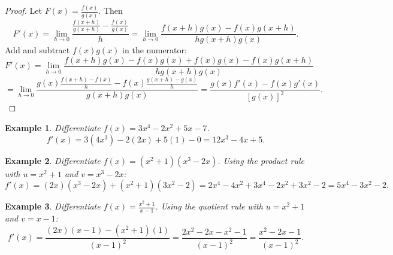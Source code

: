 \documentclass[11pt,a4paper]{article}
\newtheorem{example}{Example}
\begin{document}
\begin{proof}
Let $F(x) = \frac{f(x)}{g(x)}$. Then
\[
F'(x) = \lim_{h \to 0} \frac{\frac{f(x+h)}{g(x+h)} - \frac{f(x)}{g(x)}}{h} = \lim_{h \to 0} \frac{f(x+h)g(x) - f(x)g(x+h)}{h g(x+h) g(x)}.
\]
Add and subtract $f(x)g(x)$ in the numerator:
\[
F'(x) = \lim_{h \to 0} \frac{f(x+h)g(x) - f(x)g(x) + f(x)g(x) - f(x)g(x+h)}{h g(x+h) g(x)}
\]
\[
= \lim_{h \to 0} \frac{g(x) \frac{f(x+h) - f(x)}{h} - f(x) \frac{g(x+h) - g(x)}{h}}{g(x+h) g(x)} = \frac{g(x) f'(x) - f(x) g'(x)}{[g(x)]^2}.
\]
\end{proof}
\begin{example}
Differentiate $f(x) = 3x^4 - 2x^2 + 5x - 7$.
\[
f'(x) = 3(4x^3) - 2(2x) + 5(1) - 0 = 12x^3 - 4x + 5.
\]
\end{example}
\begin{example}
Differentiate $f(x) = (x^2 + 1)(x^3 - 2x)$.
Using the product rule with $u = x^2 + 1$ and $v = x^3 - 2x$:
\[
f'(x) = (2x)(x^3 - 2x) + (x^2 + 1)(3x^2 - 2) = 2x^4 - 4x^2 + 3x^4 - 2x^2 + 3x^2 - 2 = 5x^4 - 3x^2 - 2.
\]
\end{example}
\begin{example}
Differentiate $f(x) = \frac{x^2 + 1}{x - 1}$.
Using the quotient rule with $u = x^2 + 1$ and $v = x - 1$:
\[
f'(x) = \frac{(2x)(x - 1) - (x^2 + 1)(1)}{(x - 1)^2} = \frac{2x^2 - 2x - x^2 - 1}{(x - 1)^2} = \frac{x^2 - 2x - 1}{(x - 1)^2}.
\]
\end{example}
\end{document}
